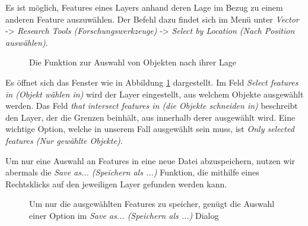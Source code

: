 \documentclass[a4paper,12pt,ngerman]{sphinxmanual}
\begin{document}
Es ist möglich, Features eines Layers anhand deren Lage im Bezug zu einem anderen Feature auszuwählen. Der Befehl dazu findet sich im Menü unter \emph{Vector} -\textgreater{} \emph{Research Tools (Forschungswerkzeuge)} -\textgreater{} \emph{Select by Location (Nach Position auswählen)}.
\begin{figure}[htbp]
\centering
\capstart

\caption{Die Funktion zur Auswahl von Objekten nach ihrer Lage}\label{uebung4:figqgisvectorselect}\end{figure}

Es öffnet sich das Fenster wie in Abbildung \hyperref[uebung4:figqgisvectorselect]{ \ref*{uebung4:figqgisvectorselect}} dargestellt.
Im Feld \emph{Select features in (Objekt wählen in)} wird der Layer eingestellt, aus welchem Objekte ausgewählt werden. Das Feld \emph{that intersect features in (die Objekte schneiden in)} beschreibt den Layer, der die Grenzen beinhält, aus innerhalb derer ausgewählt wird. Eine wichtige Option, welche in unserem Fall ausgewählt sein muss, ist \emph{Only selected features (Nur gewählte Objekte)}.

Um nur eine Auswahl an Features in eine neue Datei abzuspeichern, nutzen wir abermals die \emph{Save as... (Speichern als ...)} Funktion, die mithilfe eines Rechtsklicks auf den jeweiligen Layer gefunden werden kann.
\begin{figure}[htbp]
\centering
\capstart

\caption{Um nur die ausgewählten Features zu speicher, genügt die Auswahl einer Option im \emph{Save as... (Speichern als ...)} Dialog}\label{uebung4:figqgissaveselect}\end{figure}
\end{document}

